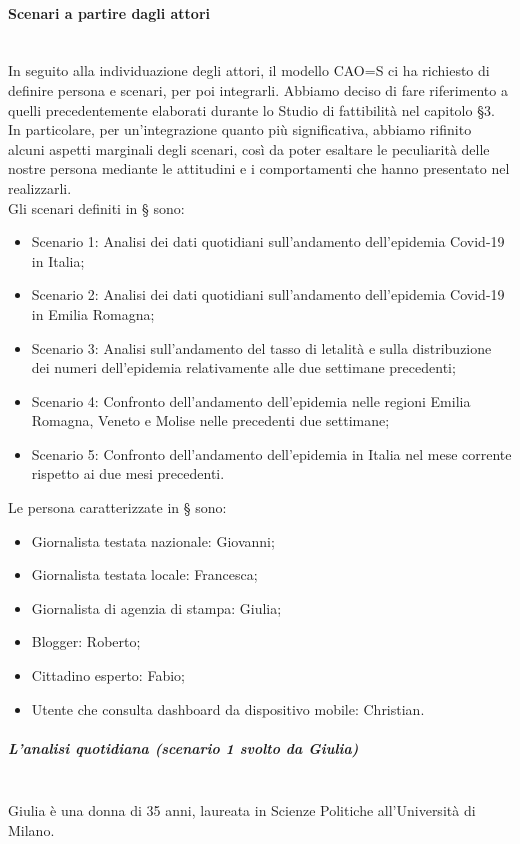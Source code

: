 \paragraph{Scenari a partire dagli attori}\mbox{}\\
In seguito alla individuazione degli attori, il modello CAO=S ci ha richiesto di definire persona e scenari, per poi integrarli.
Abbiamo deciso di fare riferimento a quelli precedentemente elaborati durante lo Studio di fattibilità nel capitolo §3.
In particolare, per un'integrazione quanto più significativa, abbiamo rifinito alcuni aspetti marginali degli scenari, così da poter esaltare le peculiarità delle nostre persona mediante le attitudini e i comportamenti che hanno presentato nel realizzarli.\\
Gli scenari definiti in § sono:
\begin{itemize}
    \item Scenario 1: Analisi dei dati quotidiani sull'andamento dell'epidemia Covid-19 in Italia;
    \item Scenario 2: Analisi dei dati quotidiani sull'andamento dell'epidemia Covid-19 in Emilia Romagna;
    \item Scenario 3: Analisi sull'andamento del tasso di letalità e sulla distribuzione dei numeri dell'epidemia relativamente alle due settimane precedenti;
    \item Scenario 4: Confronto dell'andamento dell'epidemia nelle regioni Emilia Romagna, Veneto e Molise nelle precedenti due settimane;
    \item Scenario 5: Confronto dell'andamento dell'epidemia in Italia nel mese corrente rispetto ai due mesi precedenti.
\end{itemize}
Le persona caratterizzate in § sono:
\begin{itemize}
    \item Giornalista testata nazionale: Giovanni;
    \item Giornalista testata locale: Francesca;
    \item Giornalista di agenzia di stampa: Giulia;
    \item Blogger: Roberto;
    \item Cittadino esperto: Fabio;
    \item Utente che consulta dashboard da dispositivo mobile: Christian.
\end{itemize}
\noindent
\subparagraph{L'analisi quotidiana (scenario 1 svolto da Giulia)}\mbox{}\\
Giulia è una donna di 35 anni, laureata in Scienze Politiche all'Università di Milano.
